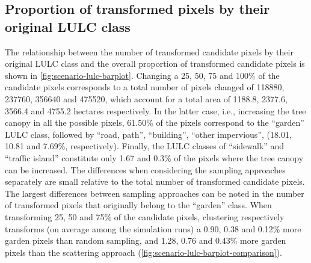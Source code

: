 \documentclass[10pt,letterpaper]{article}
\begin{document}
\subsection*{Proportion of transformed pixels by their original LULC class}

The relationship between the number of transformed candidate pixels by their original LULC class and the overall proportion of transformed candidate pixels is shown in \autoref{fig:scenario-lulc-barplot}.
Changing a 25, 50, 75 and 100\% of the candidate pixels corresponds to a total number of pixels changed of 118880, 237760, 356640 and 475520, which account for a total area of 1188.8, 2377.6, 3566.4 and 4755.2 hectares respectively.
In the latter case, i.e., increasing the tree canopy in all the possible pixels, 61.50\% of the pixels correspond to the ``garden'' LULC class, followed by ``road, path'', ``building'', ``other impervious'', (18.01, 10.81 and 7.69\%, respectively). Finally, the LULC classes of ``sidewalk'' and ``traffic island'' constitute only 1.67 and 0.3\% of the  pixels where the tree canopy can be increased.
The differences when considering the sampling approaches separately are small relative to the total number of transformed candidate pixels.
The largest differences between sampling approaches can be noted in the number of transformed pixels that originally belong to the ``garden'' class.
When transforming 25, 50 and 75\% of the candidate pixels, clustering respectively transforms (on average among the simulation runs) a 0.90, 0.38 and 0.12\% more garden pixels than random sampling, and 1.28, 0.76 and 0.43\% more garden pixels than the scattering approach (\autoref{fig:scenario-lulc-barplot-comparison}). 

\end{document}
